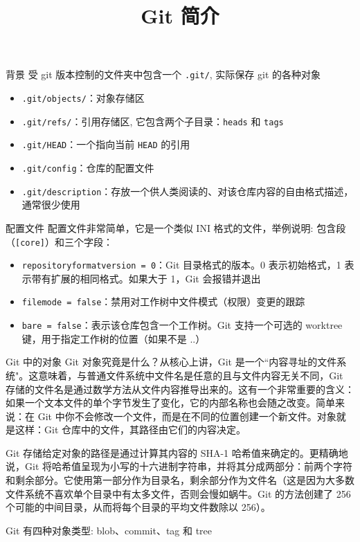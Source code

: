 \documentclass[aspectratio=169,xcolor=dvipsnames]{beamer}
\title{Git 简介}
\date{}
\theoremstyle{remark}
\begin{document}
\begin{frame}
    \titlepage
\end{frame}

\begin{frame}{背景}
受 git 版本控制的文件夹中包含一个 \verb|.git/|, 实际保存 git 的各种对象
\begin{itemize}
\item \verb|.git/objects/|：对象存储区
\item \verb|.git/refs/|：引用存储区, 它包含两个子目录：\verb|heads| 和 \verb|tags|
\item \verb|.git/HEAD|：一个指向当前 \verb|HEAD| 的引用
\item \verb|.git/config|：仓库的配置文件
\item \verb|.git/description|：存放一个供人类阅读的、对该仓库内容的自由格式描述，通常很少使用
\end{itemize}
\end{frame}

\begin{frame}{配置文件}
配置文件非常简单，它是一个类似 INI 格式的文件，举例说明: 包含段（\verb|[core]|）和三个字段：
\begin{itemize}
    \item \verb|repositoryformatversion = 0|：Git 目录格式的版本。0 表示初始格式，1 表示带有扩展的相同格式。如果大于 1，Git 会报错并退出
    \item \verb|filemode = false|：禁用对工作树中文件模式（权限）变更的跟踪
    \item \verb|bare = false|：表示该仓库包含一个工作树。Git 支持一个可选的 worktree 键，用于指定工作树的位置（如果不是 ..）
\end{itemize}
\end{frame}

\begin{frame}{Git 中的对象}
Git 对象究竟是什么？从核心上讲，Git 是一个``内容寻址的文件系统"。这意味着，与普通文件系统中文件名是任意的且与文件内容无关不同，Git 存储的文件名是通过数学方法从文件内容推导出来的。这有一个非常重要的含义：如果一个文本文件的单个字节发生了变化，它的内部名称也会随之改变。简单来说：在 Git 中你不会修改一个文件，而是在不同的位置创建一个新文件。对象就是这样：Git 仓库中的文件，其路径由它们的内容决定。

Git 存储给定对象的路径是通过计算其内容的 SHA-1 哈希值来确定的。更精确地说，Git 将哈希值呈现为小写的十六进制字符串，并将其分成两部分：前两个字符和剩余部分。它使用第一部分作为目录名，剩余部分作为文件名（这是因为大多数文件系统不喜欢单个目录中有太多文件，否则会慢如蜗牛。Git 的方法创建了 256 个可能的中间目录，从而将每个目录的平均文件数除以 256）。

Git 有四种对象类型: blob、commit、tag 和 tree
\end{frame}
\end{document}
